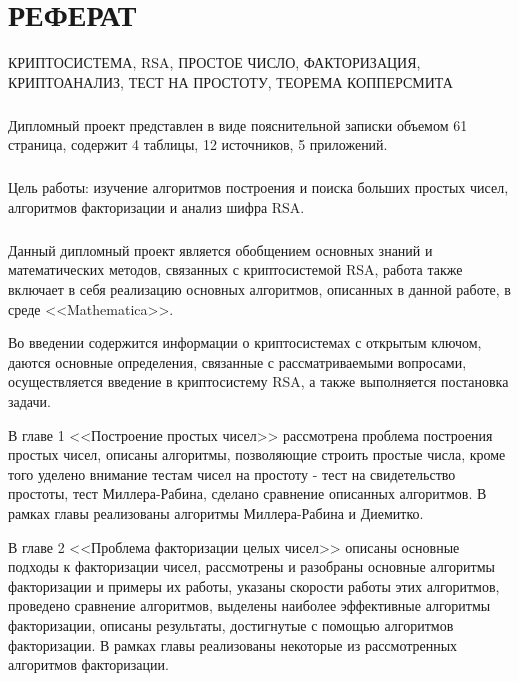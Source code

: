 
\newpage
\chapter*{РЕФЕРАТ}

КРИПТОСИСТЕМА, RSA, ПРОСТОЕ ЧИСЛО, ФАКТОРИЗАЦИЯ, КРИПТОАНАЛИЗ, ТЕСТ НА ПРОСТОТУ, ТЕОРЕМА КОППЕРСМИТА

\paragraph{} Дипломный проект представлен в виде пояснительной записки объемом 61 страница, содержит 4 таблицы, 12 источников, 5 приложений.

\paragraph{} Цель работы: изучение алгоритмов построения и поиска больших простых чисел, алгоритмов факторизации и анализ шифра RSA.

\paragraph{} Данный дипломный проект является обобщением основных знаний и математических методов, связанных с криптосистемой RSA, работа также
	включает в себя реализацию основных алгоритмов, описанных в данной работе, в среде <<Mathematica>>.	

	Во введении содержится информации о криптосистемах с открытым ключом, даются основные определения, связанные с рассматриваемыми вопросами,
	осуществляется введение в криптосистему RSA, а также выполняется постановка задачи.

	В главе 1 <<Построение простых чисел>> рассмотрена проблема построения простых чисел, описаны алгоритмы, позволяющие строить простые числа, 
	кроме того уделено внимание тестам чисел на простоту - тест на свидетельство простоты, тест Миллера-Рабина, сделано сравнение описанных алгоритмов. В рамках 
	главы реализованы алгоритмы Миллера-Рабина и Диемитко.

	В главе 2 <<Проблема факторизации целых чисел>> описаны основные подходы к факторизации чисел, рассмотрены и разобраны основные алгоритмы факторизации и примеры их работы, указаны скорости работы этих алгоритмов, проведено сравнение алгоритмов, выделены наиболее эффективные алгоритмы факторизации, описаны результаты, достигнутые с помощью алгоритмов факторизации. В рамках главы реализованы некоторые из рассмотренных алгоритмов факторизации.

